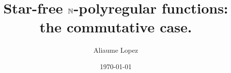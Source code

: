 \title{
    Star-free $\mathbb{N}$-polyregular functions:
    the commutative case.
}
\author{
    Aliaume Lopez
}

\date{\today}


\newcommand{\acknowledge}{
    I would like to thank Gaëtan Douéneau-Tabot
    for mentionning this problem, checking 
    my counter-example, and supporting me in publishing
    this paper.
}

\newcommand{\makeabstract}{
    \begin{abstract}
        Deciding whether a $\Rel$-rational series
        can be computed as a $\Nat$-rational series
        is an open problem that was solved by Karhumäki in the
        specific case of $\Rel$-rational series that are commutative
        and compute a polynomial.
        We propose a short counter-example to this
        previous result on commutative $\Nat$-rational series,
        and prove a corrected version of the theorem,
        working of tdd
        We then discuss how the syntactic criterion could
        pave the way towards a decision procedure when the commutativity
        of the $\Rel$-rational series
        is not assumed.

        \begin{itemize}
            \item Deciding $\Nat$ inside $\Rel$.
            \item Counter example.
            \item Characterization of $\Nat$-polyregular.
            \item Characterization of star free $\Nat$-polyregular.
        \end{itemize}
    \end{abstract}
}


